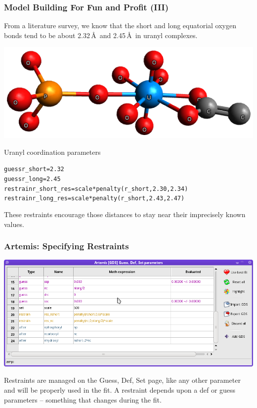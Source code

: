 \documentclass[10pt, xcolor=x11names, compress]{beamer}
\begin{document}
\begin{frame}[fragile]
  \frametitle{Model Building For Fun and Profit (III)}

  From a literature survey, we know that the short and long equatorial
  oxygen bonds tend to be about 2.32\,\AA\ and 2.45\,\AA\ in uranyl
  complexes.

  \medskip

  \begin{center}
    \quad\includegraphics[width=0.7\linewidth]{mfc/uranyl.png}
  \end{center}

  Uranyl coordination parameters
  \begin{block}{}
    \begin{alltt}
    \scriptsize
     {\color{guessp}guess}      r\_short     = 2.32
     {\color{guessp}guess}      r\_long      = 2.45
     {\color{restrainp}restrain}   r\_short\_res = scale * penalty(r\_short, 2.30, 2.34)
     {\color{restrainp}restrain}   r\_long\_res  = scale * penalty(r\_short, 2.43, 2.47)
    \end{alltt}
  \end{block}
  
  \medskip

  These restraints encourage those distances to stay near their
  imprecisely known values.
\end{frame}

\begin{frame}
  \frametitle{Artemis: Specifying Restraints}

  \begin{center}
    \includegraphics[width=\linewidth]{artemis/restraint.png}

    {\color{Orange3}Restraints} are managed on the Guess, Def, Set
    page, like any other parameter and will be properly used in the
    fit.  A restraint depends upon a {\color{Green4}def} or
    {\color{Magenta3}guess} parameters -- something that changes during
    the fit.
  \end{center}
\end{frame}
\end{document}
